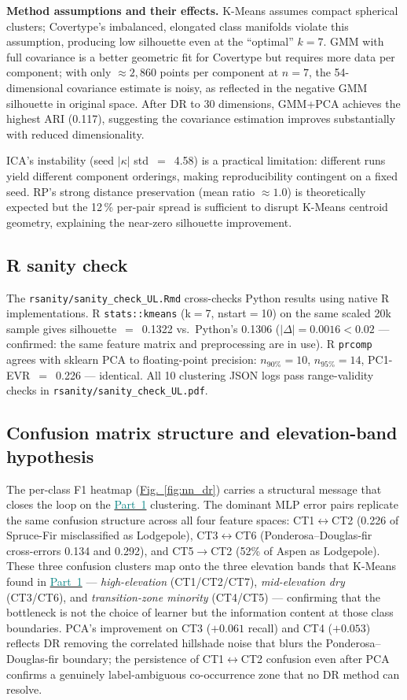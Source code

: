 \documentclass[conference]{IEEEtran}
\newcommand{\figref}[1]{\hyperref[#1]{\textcolor{denim_comp}{Fig.~\ref*{#1}}}}
\newcommand{\partref}[2]{\hyperref[#2]{\textcolor{teal}{Part~#1}}}
\begin{document}
\textbf{Method assumptions and their effects.}
K-Means assumes compact spherical clusters; Covertype's imbalanced,
elongated class manifolds violate this assumption, producing low silhouette
even at the ``optimal'' $k{=}7$.
GMM with full covariance is a better geometric fit for Covertype but
requires more data per component; with only $\approx 2,860$ points per
component at $n{=}7$, the 54-dimensional covariance estimate is noisy,
as reflected in the negative GMM silhouette in original space.
After DR to 30 dimensions, GMM+PCA achieves the highest ARI (0.117),
suggesting the covariance estimation improves substantially with reduced
dimensionality.

ICA's instability (seed $|\kappa|$ std~$=$~4.58) is a practical limitation:
different runs yield different component orderings, making reproducibility
contingent on a fixed seed.
RP's strong distance preservation (mean ratio $\approx 1.0$) is theoretically
expected but the 12\,\% per-pair spread is sufficient to disrupt K-Means
centroid geometry, explaining the near-zero silhouette improvement.

\subsection{R sanity check}\label{sec:disc:rsanity}
The \texttt{rsanity/sanity\_check\_UL.Rmd} cross-checks Python results using
native R implementations.
R \texttt{stats::kmeans} (k$=$7, nstart$=$10) on the same scaled 20k sample
gives silhouette~$=$~0.1322 vs.\ Python's 0.1306
($|\Delta|{=}0.0016{<}0.02$ --- confirmed: the same feature matrix and
preprocessing are in use).
R \texttt{prcomp} agrees with sklearn PCA to floating-point precision:
$n_{90\%}{=}10$, $n_{95\%}{=}14$, PC1-EVR~$=$~0.226 --- identical.
All 10 clustering JSON logs pass range-validity checks in
\texttt{rsanity/sanity\_check\_UL.pdf}.

\subsection{Confusion matrix structure and elevation-band hypothesis}
\label{sec:disc:cm}
The per-class F1 heatmap (\figref{fig:nn_dr}) carries a structural message
that closes the loop on the \partref{1}{sec:p1} clustering.
The dominant MLP error pairs replicate the same confusion structure across
all four feature spaces: CT1$\leftrightarrow$CT2 (0.226 of Spruce-Fir
misclassified as Lodgepole), CT3$\leftrightarrow$CT6 (Ponderosa--Douglas-fir
cross-errors 0.134 and 0.292), and CT5$\to$CT2 (52\% of Aspen as Lodgepole).
These three confusion clusters map onto the three elevation bands that
K-Means found in \partref{1}{sec:p1} --- \emph{high-elevation} (CT1/CT2/CT7),
\emph{mid-elevation dry} (CT3/CT6), and \emph{transition-zone minority}
(CT4/CT5) --- confirming that the bottleneck is not the choice of
learner but the information content at those class boundaries.
PCA's improvement on CT3 ($+0.061$ recall) and CT4 ($+0.053$) reflects
DR removing the correlated hillshade noise that blurs the Ponderosa--
Douglas-fir boundary; the persistence of CT1$\leftrightarrow$CT2 confusion
even after PCA confirms a genuinely label-ambiguous co-occurrence zone
that no DR method can resolve.
\end{document}
